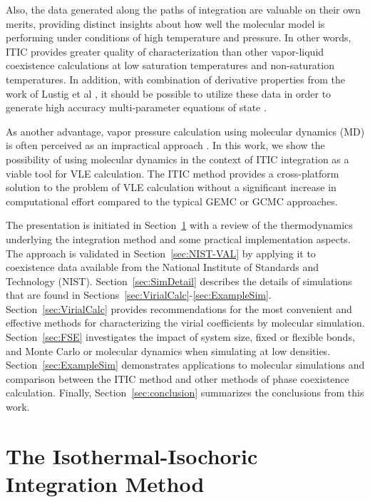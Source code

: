 \documentclass[5p,times]{elsarticle}
\begin{document}
Also, the data generated along the paths of integration are valuable on their own merits, providing distinct insights about how well the molecular model is performing under conditions of high temperature and pressure. In other words, ITIC provides greater quality of characterization than other vapor-liquid coexistence calculations at low saturation temperatures and non-saturation temperatures. In addition, with combination of derivative properties from the work of Lustig et al \cite{Lustig2015}, it should be possible to utilize these data in order to generate high accuracy multi-parameter equations of state \cite{Thol2016_LJ,Thol2016_siloxane,Thol2016_siloxane_first,Thol2017,Rutkai2013,Rutkai2015,Thol2015,Thol2015b}.

As another advantage, vapor pressure calculation using molecular dynamics (MD) is often perceived as an impractical approach \cite{Nieto-Draghi2015}. In this work, we show the possibility of using molecular dynamics in the context of ITIC integration as a viable tool for VLE calculation. The ITIC method provides a cross-platform solution to the problem of VLE calculation without a significant increase in computational effort compared to the typical GEMC or GCMC approaches.
 
The presentation is initiated in Section~\ref{sec:ITIC-method} with a review of the thermodynamics underlying the integration method and some practical implementation aspects. The approach is validated in Section~\ref{sec:NIST-VAL} by applying it to coexistence data available from the National Institute of Standards and Technology (NIST). Section~\ref{sec:SimDetail} describes the details of simulations that are found in Sections~\ref{sec:VirialCalc}-\ref{sec:ExampleSim}. Section~\ref{sec:VirialCalc} provides recommendations for the most convenient and effective methods for characterizing the virial coefficients by molecular simulation. Section~\ref{sec:FSE} investigates the impact of system size, fixed or flexible bonds, and Monte Carlo or molecular dynamics when simulating at low densities. Section~\ref{sec:ExampleSim} demonstrates applications to molecular simulations and comparison between the ITIC method and other methods of phase coexistence calculation. Finally, Section~\ref{sec:conclusion} summarizes the conclusions from this work.

\section{The Isothermal-Isochoric Integration Method} \label{sec:ITIC-method}
\end{document}
